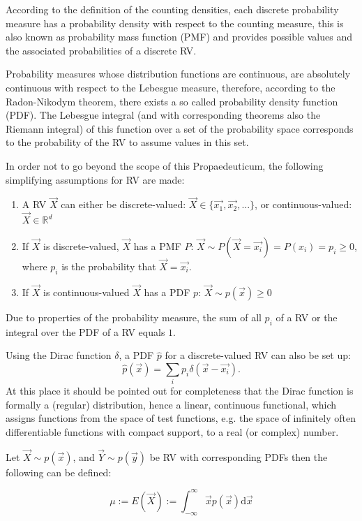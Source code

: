 According to the definition of the counting densities, each discrete probability measure has a probability density with respect to the counting measure, this is also known as probability mass function (PMF) and provides possible values and the associated probabilities of a discrete RV.

Probability measures whose distribution functions are continuous, are absolutely continuous with respect to the Lebesgue measure, therefore, according to the Radon-Nikodym theorem, there exists a so called probability density function (PDF). The Lebesgue integral (and with corresponding theorems also the Riemann integral) of this function over a set of the probability space corresponds to the probability of the RV to assume values in this set.

In order not to go beyond the scope of this Propaedeuticum, the following simplifying assumptions for RV are made:
\begin{enumerate}
    \item A RV $\vec{X}$ can either be discrete-valued: $\vec{X}\in\{\vec{x_1}, \vec{x_2}, ...\}$, or continuous-valued: $\vec{X} \in \mathbb{R}^d$
    \item If $\vec{X}$ is discrete-valued, $\vec{X}$ has a PMF $P$: $\vec{X} \sim P(\vec{X} = \vec{x_i}) = P({x_i}) = p_i \geq 0$, where $p_i$ is the probability that $\vec{X} = \vec{x_i}$.
    \item If $\vec{X}$ is continuous-valued $\vec{X}$ has a PDF $p$: $\vec{X} \sim p(\vec{x}) \geq 0$
\end{enumerate}
Due to properties of the probability measure, the sum of all $p_i$ of a RV or the integral over the PDF of a RV equals $1$.

Using the Dirac function $\delta$, a PDF $\hat{p}$ for a discrete-valued RV can also be set up:
\begin{equation}
    \hat{p}(\vec{x}) = \sum_{i} p_i \delta(\vec{x}-\vec{x_i}).
    \label{eq:disc}
\end{equation}
At this place it should be pointed out for completeness that the Dirac function is formally a (regular) distribution, hence a linear, continuous functional, which assigns functions from the space of test functions, e.g. the space of infinitely often differentiable functions with compact support, to a real (or complex) number.

Let $\vec{X} \sim p(\vec{x})$, and $\vec{Y} \sim p(\vec{y})$ be RV with corresponding PDFs then the following can be defined:

\begin{definition}
\begin{equation}
    \mu := E(\vec{X}) := \int_{-\infty}^{\infty} \vec{x} p(\vec{x})\mathrm{d}\vec{x}
\end{equation}
\end{definition}

